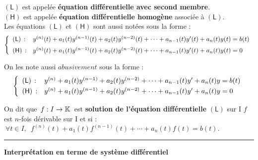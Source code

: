 \noindent $(\mathsf{L})$ est appelée \textbf{équation différentielle avec second membre}.\vspace{0.1cm}\\
$(\mathsf{H})$ est appelée \textbf{équation différentielle homogène} associée à $(\mathsf{L})$.\vspace{0.235cm}\\
Les équations $(\mathsf{L})$ et $(\mathsf{H})$ sont aussi notées sous la forme :\vspace{-0.1cm}
\[\left\{
\begin{array}{ll}
    (\mathsf{L})\,: & y^{(n)}(t)+a_1(t)y^{(n-1)}(t)+a_2(t)y^{(n-2)}(t)+\cdots+a_{n-1}(t)y'(t)+a_n(t)y(t)=b(t)\vspace{0.2cm}\\
    (\mathsf{H})\,: & y^{(n)}(t)+a_1(t)y^{(n-1)}(t)+a_2(t)y^{(n-2)}(t)+\cdots+a_{n-1}(t)y'(t)+a_n(t)y(t)=0
\end{array}
 \right.\]\vspace{0.2cm}

On les note aussi $abusivement$ sous la forme :
\[\left\{
\begin{array}{ll}
    (\mathsf{L})\,: & y^{(n)}+a_1(t)y^{(n-1)}+a_2(t)y^{(n-2)}+\cdots+a_{n-1}(t)y'+a_n(t)y=b(t)\vspace{0.1cm}\\
    (\mathsf{H})\,: & y^{(n)}+a_1(t)y^{(n-1)}+a_2(t)y^{(n-2)}+\cdots+a_{n-1}(t)y'+a_n(t)y=0
\end{array}
 \right.\]\vspace{1cm}

On dit que \(\,f:I\to \mathbb{K}\,\) est \textbf{solution de l'équation différentielle} $(\mathsf{L})$ sur I \ssi $f$\vspace{0.1cm}\\
est $n$-fois dérivable sur I et si : \(\ \forall t\in I,\ \; f^{(n)}(t)+a_1(t)f^{(n-1)}(t)+\cdots+a_n(t)f(t)=b(t).\)

\vspace{1.5cm}

\hrule

\vspace{1cm}

\begin{center}\textbf{Interprétation en terme de système différentiel}\end{center}

